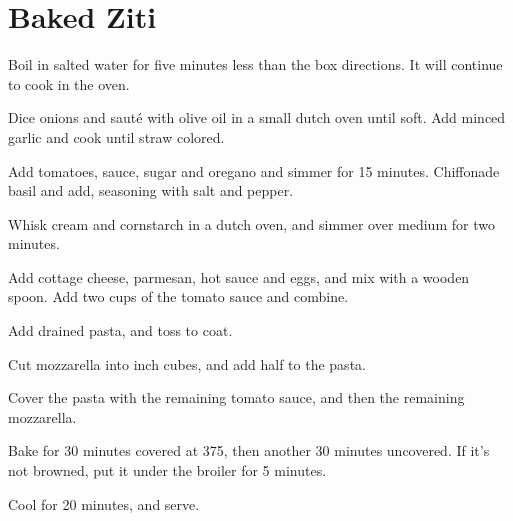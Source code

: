 
\section{Baked Ziti}
\begin{recipe}



Boil in salted water for five minutes less than the box directions. It will continue to cook in the oven.


Dice onions and sauté with olive oil in a small dutch oven until soft. Add minced garlic and cook until straw colored.

Add tomatoes, sauce, sugar and oregano and simmer for 15 minutes. Chiffonade basil and add, seasoning with salt and pepper.


Whisk cream and cornstarch in a dutch oven, and simmer over medium for two minutes.

Add cottage cheese, parmesan, hot sauce and eggs, and mix with a wooden spoon. Add two cups of the tomato sauce and combine.

Add drained pasta, and toss to coat.


Cut mozzarella into  inch cubes, and add half to the pasta.

Cover the pasta with the remaining tomato sauce, and then the remaining mozzarella.

Bake for 30 minutes covered at 375\degree{}, then another 30 minutes uncovered. If it's not browned, put it under the broiler for 5 minutes.

Cool for 20 minutes, and serve.

\end{recipe}
